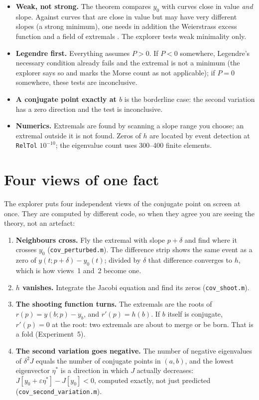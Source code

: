 \documentclass[11pt]{article}
\newcommand{\file}[1]{\texttt{#1}}
\begin{document}
\begin{warn}
\begin{itemize}
\item \textbf{Weak, not strong.} The theorem compares $y_0$ with curves close in
value \emph{and} slope. Against curves that are close in value but may have very
different slopes (a strong minimum), one needs in addition the Weierstrass excess
function and a field of extremals \cite{gelfand}. The explorer tests weak
minimality only.
\item \textbf{Legendre first.} Everything assumes $P > 0$. If $P < 0$ somewhere,
Legendre's necessary condition already fails and the extremal is not a minimum
(the explorer says so and marks the Morse count as not applicable); if $P = 0$
somewhere, these tests are inconclusive.
\item \textbf{A conjugate point exactly at $b$} is the borderline case: the
second variation has a zero direction and the test is inconclusive.
\item \textbf{Numerics.} Extremals are found by scanning a slope range you
choose; an extremal outside it is not found. Zeros of $h$ are located by event
detection at \file{RelTol} $10^{-10}$; the eigenvalue count uses 300--400 finite
elements.
\end{itemize}
\end{warn}

\section{Four views of one fact}

\begin{intu}
The explorer puts four independent views of the conjugate point on screen at
once. They are computed by different code, so when they agree you are seeing the
theory, not an artefact:
\begin{enumerate}
\item \textbf{Neighbours cross.} Fly the extremal with slope $p + \delta$ and find
where it crosses $y_0$ (\file{cov\_perturbed.m}). The difference strip shows the
same event as a zero of $y(t;p+\delta) - y_0(t)$; divided by $\delta$ that
difference converges to $h$, which is how views~1 and~2 become one.
\item \textbf{$h$ vanishes.} Integrate the Jacobi equation and find its zeros
(\file{cov\_shoot.m}).
\item \textbf{The shooting function turns.} The extremals are the roots of
$r(p) = y(b;p) - y_b$, and $r'(p) = h(b)$. If $b$ itself is conjugate, $r'(p) = 0$
at the root: two extremals are about to merge or be born. That is a fold
(Experiment~5).
\item \textbf{The second variation goes negative.} The number of negative
eigenvalues of $\delta^2 J$ equals the number of conjugate points in $(a, b)$, and
the lowest eigenvector $\eta^*$ is a direction in which $J$ actually decreases:
$J[y_0 + \varepsilon\eta^*] - J[y_0] < 0$, computed exactly, not just predicted
(\file{cov\_second\_variation.m}).
\end{enumerate}
\end{intu}
\end{document}
